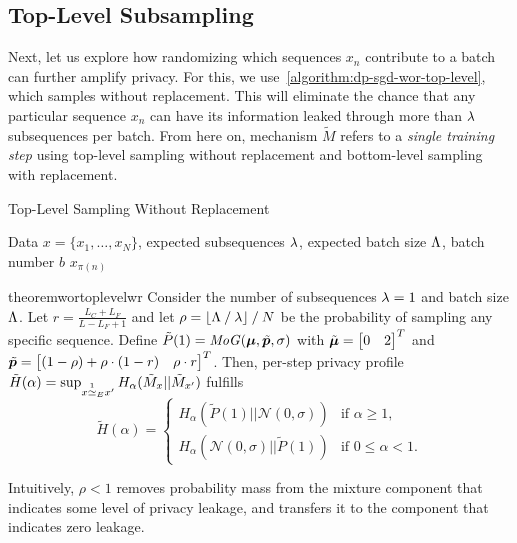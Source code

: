 \subsection{Top-Level Subsampling}\label{section:top_level_subsampling}
Next, let us explore how randomizing which sequences $x_n$ contribute to a batch can further amplify privacy. 
For this, we use~\cref{algorithm:dp-sgd-wor-top-level}, which samples without replacement.
This will 
eliminate the chance that any particular sequence $x_n$ can have its information leaked through more than $\lambda$ subsequences per batch. 
From here on, mechanism $\tilde{M}$ refers to a \emph{single training step} using top-level sampling without replacement and bottom-level sampling with replacement.
\begin{algorithm}
   \caption{Top-Level Sampling Without Replacement}
   \label{algorithm:dp-sgd-wor-top-level}
\begin{algorithmic}
    Data $x = \{x_1, \dots, x_N\}$, expected subsequences $\lambda$, expected batch size $\Lambda$, batch number $b$
     \hfill {}
         $x_{\pi(n)}$
    \ENDFOR
\end{algorithmic}
\end{algorithm}
\begin{restatable}{theorem}{wortoplevelwr}\label{theorem:wor_top_level_wr}
    Consider the number of subsequences $\lambda = 1$ and 
    batch size $\Lambda$.
    Let $r = \frac{L_C + L_F}{L - L_F + 1}$ and let 
    $\rho = \lfloor \Lambda \mathbin{/} \lambda \rfloor \mathbin{/} N$ be the probability of sampling any specific sequence. 
    Define
    $\tilde{P}(1) = \mathit{MoG}({\bm{\mu}}, \tilde{{\bm{p}}}, \sigma)$ with
     $\tilde{{\bm{\mu}}} = \begin{bmatrix}
        0 & 2
    \end{bmatrix}^T$ and 
     $\tilde{{\bm{p}}} = \begin{bmatrix} (1 - \rho) + \rho \cdot (1-r) & \rho \cdot r\end{bmatrix}^T$.
    Then, per-step privacy profile $\tilde{H}(\alpha) = \sup_{x \overset{1}{\simeq}_{E} x'} H_\alpha(\tilde{M}_x || \tilde{M}_{x'})$ fulfills 
    \begin{equation*}
        \tilde{H}(\alpha) = 
        \begin{cases}
            H_\alpha(\tilde{P}(1) || \mathcal{N}(0,\sigma)) & \text{if } \alpha \geq 1,\\
            H_\alpha(\mathcal{N}(0,\sigma) || \tilde{P}(1)) & \text{if } 0 \leq \alpha < 1.
        \end{cases}
    \end{equation*}
    \end{restatable}
Intuitively, $\rho < 1$ removes probability mass from the mixture component that indicates some level of privacy leakage, and transfers it to the component that indicates zero leakage.

